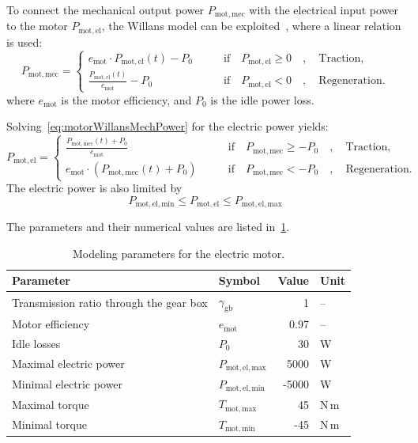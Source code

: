To connect the mechanical output power $P_\mathrm{mot,mec}$ with the electrical input power to the motor $P_\mathrm{mot,el}$, the Willans model can be exploited~\cite{vps:2007book}, where a linear relation is used:
\begin{equation}
	P_\mathrm{mot,mec} =
\begin{cases}
	e_\mathrm{mot} \cdot P_\mathrm{mot,el}(t) - P_0 \qquad & \text{if} \quad P_\mathrm{mot,el} \geq 0 \quad , \quad \text{Traction,} \\
	\frac{P_\mathrm{mot,el}(t)}{e_\mathrm{mot}} - P_0 \qquad & \text{if} \quad P_\mathrm{mot,el} < 0 \quad , \quad \text{Regeneration.}
\end{cases}
\label{eq:motorWillansMechPower}
\end{equation}
where $e_\mathrm{mot}$ is the motor efficiency, and $P_0$ is the idle power loss.

Solving~\cref{eq:motorWillansMechPower} for the electric power yields:
\begin{equation}	
	P_\mathrm{mot,el} =
	\begin{cases}
		\frac{P_\mathrm{mot,mec}(t) + P_0}{e_\mathrm{mot}} \qquad & \text{if} \quad P_\mathrm{mot,mec} \geq -P_0 \quad , \quad \text{Traction,} \\
		e_\mathrm{mot} \cdot \left(P_\mathrm{mot,mec}(t) + P_0 \right) \qquad & \text{if} \quad P_\mathrm{mot,mec} < -P_0 \quad , \quad \text{Regeneration.}
	\end{cases}
\end{equation}
The electric power is also limited by
\begin{equation}
	P_\mathrm{mot,el,min} \leq P_\mathrm{mot,el} \leq P_\mathrm{mot,el,max}
\end{equation}

The parameters and their numerical values are listed in~\cref{tab:modelingParametersMotor}.
\begin{table}[htbp]
	\centering
	\caption{Modeling parameters for the electric motor.}
	\label{tab:modelingParametersMotor}
	
	\begin{tabular}{l l r l}
		\toprule
		Parameter 								& Symbol 					& Value & Unit\\ 
		\midrule
		Transmission ratio through the gear box & $\gamma_\mathrm{gb}$      & 1     & -- \\
		Motor efficiency 						& $e_\mathrm{mot}$      	& 0.97  & -- \\
		Idle losses 							& $P_0$      				& 30    & \unit{W} \\
		Maximal electric power 					& $P_\mathrm{mot,el,max}$	& 5000  & \unit{W} \\
		Minimal electric power 					& $P_\mathrm{mot,el,min}$   & -5000 & \unit{W} \\
		Maximal torque 							& $T_\mathrm{mot,max}$      & 45    & \unit{N$\,$m} \\
		Minimal torque 							& $T_\mathrm{mot,min}$      & -45   & \unit{N$\,$m} \\
		\bottomrule
	\end{tabular}
\end{table}


